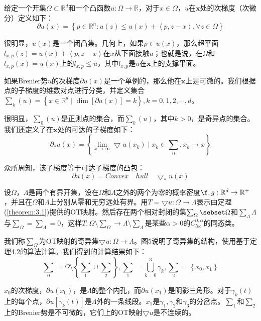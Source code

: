 \begin{definition}[次梯度]
	给定一个开集$\Omega \subset \mathbb{R}^d$和一个凸函数$u: \Omega \to \mathbb{R}$，对于$x \in \Omega$，$u$在$\mathbf{x}$处的次梯度（次微分）定义如下：
	\begin{equation*}
		\partial u(x)=\left \{ p \in \mathbb{R}^n : u(z) \le u(x) + \left \langle p,z-x \right \rangle , \forall z \in \Omega \right \}    
	\end{equation*}
	
	很明显，$u(x)$是一个闭凸集。几何上，如果$\rho \in u(x)$，那么超平面$l_{x,p}(z)=u(x)+\left \langle p,z-x \right \rangle $在$x$从下面接触$u$；也就是说，在$\Omega$和$l_{x,p}(x)=u(x)$上的$l_{x,p} \le u$，其中$l_{x,p}$是$u$在$\mathbf{x}$上的支撑平面。
	
	如果Brenier势$u$的次梯度$\partial u(x)$是一个单例的，那么他在$\mathbf{x}$上是可微的。我们根据点的子梯度的维数对点进行分类，并定义集合 $\sum _k (u) =\left \{ x \in \mathbb{R}^d \mid \dim \left [ \partial u(x) \right ] =k  \right \} ,k=0,1,2,\cdots ,d$。
	
	很明显，$\sum _0(u)$是正则点的集合，而$\sum _k(u)$，其中$k>0$，是奇异点的集合。我们还定义了在$\mathbf{x}$处的可达的子梯度如下：
	\begin{equation*}
		\partial _* u(x)=\left \{ \lim_{x \to \infty} \bigtriangledown u(x_k) \mid x_k \in \sum _0, x_k \to x \right \}    
	\end{equation*}

	众所周知，该子梯度等于可达子梯度的凸包：
	\begin{equation*}
		\partial u(x)=Convex \quad hull \quad \bigtriangledown _* u(x)
	\end{equation*}
	\label{definition:3.7}
\end{definition}

\begin{theorem}[规律性]
	设$\Omega$，$\Lambda$是两个有界开集，设在$\Omega$和$\Lambda$之外的两个为零的概率密度$\f,g : \mathbb{R}^d \to \mathbb{R} ^+$，并且在$\Omega$和$\Lambda$上分别从零和无穷远处有界。用$T=\bigtriangledown u: \Omega \to \Lambda$表示由定理(\ref{theorem:3.1})提供的OT映射。然后存在两个相对封闭的集$\sum _{\Omega} \sebset \Omega$和$\sum _{\Lambda} \Lambda$与$\sum _{\Omega} = \sum _{\Lambda} =0$，这样$T: \Omega \setminus \sum _{\Omega} \to \Lambda \setminus \sum _{\Lambda}$是某些$\alpha > 0$的$C_{loc}^{0,\alpha}$的同态类。
	
	我们称$\sum_{\Omega}$为OT映射的奇异集$\bigtriangledown u : \Omega \to \Lambda$。图5说明了奇异集的结构，使用基于定理4.2的算法计算。我们得到的计算结果如下：
	\begin{equation*}
		\sum _0 = \Omega  \setminus \left \{ \sum _1 \cup \sum _2 \right \}, \sum _1=\bigcup_{k=0}^{3} \gamma _k, \sum _2=\left \{ x_0,x_1 \right \}    
	\end{equation*}
	
	$x_0$的次梯度，$\partial u(x_0)$，是$\Lambda$的整个内孔，而$\partial u(x_1)$是阴影三角形。对于$\gamma _k (t)$上的每个点，$\partial u \left [ \gamma_k(t) \right ]$是$\Lambda$外的一条线段。$x_1$是$\gamma_1,\gamma_2$和$\gamma_3$的分岔点。$\sum_1$和$\sum_2$上的Brenier势是不可微的，它们上的OT映射$\bigtriangledown u$是不连续的。
	\label{theorem:3.5}
\end{theorem}